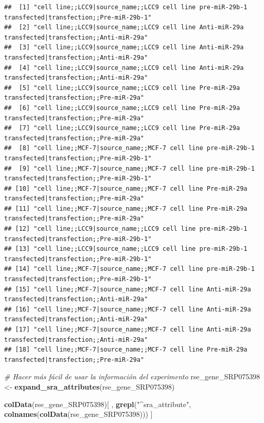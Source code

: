 \documentclass[
]{article}
\newenvironment{Shaded}{\begin{snugshade}}{\end{snugshade}}
\newcommand{\CommentTok}[1]{\textcolor[rgb]{0.56,0.35,0.01}{\textit{#1}}}
\newcommand{\FunctionTok}[1]{\textcolor[rgb]{0.13,0.29,0.53}{\textbf{#1}}}
\newcommand{\NormalTok}[1]{#1}
\newcommand{\OtherTok}[1]{\textcolor[rgb]{0.56,0.35,0.01}{#1}}
\newcommand{\StringTok}[1]{\textcolor[rgb]{0.31,0.60,0.02}{#1}}
\begin{document}
\begin{verbatim}
##  [1] "cell line;;LCC9|source_name;;LCC9 cell line pre-miR-29b-1 transfected|transfection;;Pre-miR-29b-1"  
##  [2] "cell line;;LCC9|source_name;;LCC9 cell line Anti-miR-29a transfected|transfection;;Anti-miR-29a"    
##  [3] "cell line;;LCC9|source_name;;LCC9 cell line Anti-miR-29a transfected|transfection;;Anti-miR-29a"    
##  [4] "cell line;;LCC9|source_name;;LCC9 cell line Anti-miR-29a transfected|transfection;;Anti-miR-29a"    
##  [5] "cell line;;LCC9|source_name;;LCC9 cell line Pre-miR-29a transfected|transfection;;Pre-miR-29a"      
##  [6] "cell line;;LCC9|source_name;;LCC9 cell line Pre-miR-29a transfected|transfection;;Pre-miR-29a"      
##  [7] "cell line;;LCC9|source_name;;LCC9 cell line Pre-miR-29a transfected|transfection;;Pre-miR-29a"      
##  [8] "cell line;;MCF-7|source_name;;MCF-7 cell line pre-miR-29b-1 transfected|transfection;;Pre-miR-29b-1"
##  [9] "cell line;;MCF-7|source_name;;MCF-7 cell line pre-miR-29b-1 transfected|transfection;;Pre-miR-29b-1"
## [10] "cell line;;MCF-7|source_name;;MCF-7 cell line Pre-miR-29a transfected|transfection;;Pre-miR-29a"    
## [11] "cell line;;MCF-7|source_name;;MCF-7 cell line Pre-miR-29a transfected|transfection;;Pre-miR-29a"    
## [12] "cell line;;LCC9|source_name;;LCC9 cell line pre-miR-29b-1 transfected|transfection;;Pre-miR-29b-1"  
## [13] "cell line;;LCC9|source_name;;LCC9 cell line pre-miR-29b-1 transfected|transfection;;Pre-miR-29b-1"  
## [14] "cell line;;MCF-7|source_name;;MCF-7 cell line pre-miR-29b-1 transfected|transfection;;Pre-miR-29b-1"
## [15] "cell line;;MCF-7|source_name;;MCF-7 cell line Anti-miR-29a transfected|transfection;;Anti-miR-29a"  
## [16] "cell line;;MCF-7|source_name;;MCF-7 cell line Anti-miR-29a transfected|transfection;;Anti-miR-29a"  
## [17] "cell line;;MCF-7|source_name;;MCF-7 cell line Anti-miR-29a transfected|transfection;;Anti-miR-29a"  
## [18] "cell line;;MCF-7|source_name;;MCF-7 cell line Pre-miR-29a transfected|transfection;;Pre-miR-29a"
\end{verbatim}

\begin{Shaded}
\begin{Highlighting}[]
\CommentTok{\# Hacer más fácil de usar la información del experimento}
\NormalTok{rse\_gene\_SRP075398 }\OtherTok{\textless{}{-}} \FunctionTok{expand\_sra\_attributes}\NormalTok{(rse\_gene\_SRP075398)}

\FunctionTok{colData}\NormalTok{(rse\_gene\_SRP075398)[}
\NormalTok{  ,}
  \FunctionTok{grepl}\NormalTok{(}\StringTok{"\^{}sra\_attribute"}\NormalTok{, }\FunctionTok{colnames}\NormalTok{(}\FunctionTok{colData}\NormalTok{(rse\_gene\_SRP075398)))}
\NormalTok{]}
\end{Highlighting}
\end{Shaded}
\end{document}

